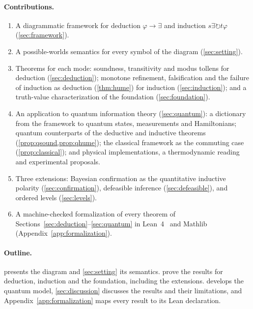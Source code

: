 \paragraph{Contributions.}
\begin{enumerate}
  \item A diagrammatic framework for deduction $\varphi\to\exists$ and induction
        $s\exists\circlearrowright t\varphi$ (\cref{sec:framework}).
  \item A possible-worlds semantics for every symbol of the diagram (\cref{sec:setting}).
  \item Theorems for each mode: soundness, transitivity and modus tollens for deduction
        (\cref{sec:deduction}); monotone refinement, falsification and the failure of
        induction as deduction (\cref{thm:hume}) for induction (\cref{sec:induction}); and a
        truth-value characterization of the foundation (\cref{sec:foundation}).
  \item An application to quantum information theory (\cref{sec:quantum}): a dictionary from the
        framework to quantum states, measurements and Hamiltonians; quantum counterparts of the
        deductive and inductive theorems (\cref{prop:qsound,prop:qhume}); the classical
        framework as the commuting case (\cref{prop:classical}); and physical implementations,
        a thermodynamic reading and experimental proposals.
  \item Three extensions: Bayesian confirmation as the quantitative inductive polarity
        (\cref{sec:confirmation}), defeasible inference (\cref{sec:defeasible}), and ordered
        levels (\cref{sec:levels}).
  \item A machine-checked formalization of every theorem of
        Sections~\ref{sec:deduction}--\ref{sec:quantum} in Lean~4~\cite{lean4} and
        Mathlib~\cite{mathlib} (Appendix~\ref{app:formalization}).
\end{enumerate}

\paragraph{Outline.}  presents the diagram and \cref{sec:setting} its
semantics.  prove the results for deduction,
induction and the foundation, including the extensions.  develops the quantum
model, \cref{sec:discussion} discusses the results and their limitations, and
Appendix~\ref{app:formalization} maps every result to its Lean declaration.
